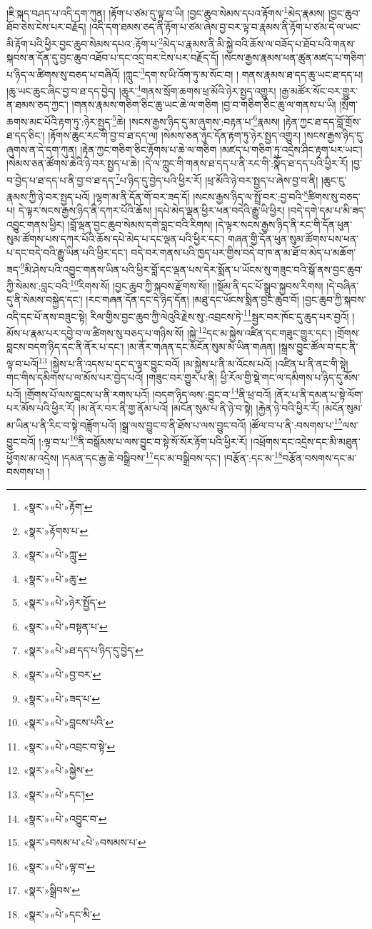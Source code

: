 །ཇི་སྐད་བཤད་པ་འདི་དག་ཀུན། །རྟོག་པ་ཙམ་དུ་ལྟ་བ་ཡི། །བྱང་ཆུབ་སེམས་དཔའ་རྟོགས་\footnote{«སྣར་»«པེ་»རྟོག་}མེད་རྣམས། །བྱང་ཆུབ་ཐོབ་ཅེས་ངེས་པར་བརྗོད། །འདི་དག་ཐམས་ཅད་ནི་རྟོག་པ་ཙམ་ཞེས་བྱ་བར་ལྟ་བ་རྣམས་ནི་རྟོག་པ་ཙམ་དེ་ལ་ཡང་མི་རྟོག་པའི་ཕྱིར་བྱང་ཆུབ་སེམས་དཔའ་:རྟོག་པ་\footnote{«སྣར་»རྟོགས་པ་}མེད་པ་རྣམས་ནི་མི་སྐྱེ་བའི་ཆོས་ལ་བཟོད་པ་ཐོབ་པའི་གནས་སྐབས་ན་དོན་དུ་བྱང་ཆུབ་འཐོབ་པ་དང་འདྲ་བར་ངེས་པར་བརྗོད་དོ། །སངས་རྒྱས་རྣམས་ཕན་ཚུན་མཛད་པ་གཅིག་པ་ཉིད་ལ་ཚིགས་སུ་བཅད་པ་བཞིའོ། །ཀླུང་\footnote{«སྣར་»«པེ་»ཀླུ་}དག་ས་ཡི་འོག་ཏུ་མ་སོང་བ། །
གནས་རྣམས་ཐ་དད་ཆུ་ཡང་ཐ་དད་པ། །ཆུ་ཡང་ཆུང་ཞིང་བྱ་བ་ཐ་དད་བྱེད། །ཆུར་\footnote{«སྣར་»«པེ་»ཆུ་}གནས་སྲོག་ཆགས་ཕྲ་མོའི་ཉེར་སྤྱད་འགྱུར། །རྒྱ་མཚོར་སོང་བར་གྱུར་ན་ཐམས་ཅད་ཀྱང་། །གནས་རྣམས་གཅིག་ཅིང་ཆུ་ཡང་ཆེ་ལ་གཅིག །བྱ་བ་གཅིག་ཅིང་ཆུ་ལ་གནས་པ་ཡི། །སྲོག་ཆགས་མང་པོའི་རྟག་ཏུ་:ཉེར་སྤྱད་\footnote{«སྣར་»«པེ་»ཉེར་སྤྱོད་}ཆེ། །སངས་རྒྱས་ཉིད་དུ་མ་ཞུགས་:བརྟན་པ་\footnote{«སྣར་»«པེ་»བསྟན་པ་}རྣམས། །རྟེན་ཀྱང་ཐ་དད་བློ་གྲོས་ཐ་དད་ཅིང་། །རྟོགས་ཆུང་རང་གི་བྱ་བ་ཐ་དད་ལ། །སེམས་ཅན་ཉུང་དོན་རྟག་ཏུ་ཉེར་སྤྱད་འགྱུར། །སངས་རྒྱས་ཉིད་དུ་ཞུགས་ན་དེ་དག་ཀུན། །རྟེན་ཀྱང་གཅིག་ཅིང་རྟོགས་པ་ཆེ་ལ་གཅིག །མཛད་པ་གཅིག་ཏུ་འདྲེས་ཤིང་རྟག་པར་ཡང་། །སེམས་ཅན་ཚོགས་ཆེའི་ཉེ་བར་སྤྱད་པ་ཆེ། །དེ་ལ་ཀླུང་གི་གནས་ཐ་དད་པ་ནི་རང་གི་:སྣོད་ཐ་དད་པའི་ཕྱིར་རོ། །བྱ་བ་བྱེད་པ་ཐ་དད་པ་ནི་བྱ་བ་ཐ་དད་\footnote{«སྣར་»«པེ་»ཐ་དད་པ་ཉིད་དུ་བྱེད་}པ་ཉིད་དུ་བྱེད་པའི་ཕྱིར་རོ། །ཕྲ་མོའི་ཉེ་བར་སྤྱད་པ་ཞེས་བྱ་བ་ནི། །ཆུང་ངུ་རྣམས་ཀྱི་ཉེ་བར་སྤྱད་པའོ། །ལྷག་མ་ནི་དོན་གོ་བར་ཟད་དོ། །སངས་རྒྱས་ཉིད་ལ་སྤྲོ་བར་:བྱ་བའི་\footnote{«སྣར་»«པེ་»བྱ་བར་}ཚིགས་སུ་བཅད་པ། དེ་ལྟར་སངས་རྒྱས་ཉིད་ནི་དཀར་པོའི་ཆོས། །དཔེ་མེད་ལྡན་ཕྱིར་ཕན་བདེའི་རྒྱུ་ཡི་ཕྱིར། །བདེ་དགེ་དམ་པ་མི་ཟད་འབྱུང་གནས་ཕྱིར། །བློ་ལྡན་བྱང་ཆུབ་སེམས་དགེ་བླང་བའི་རིགས། །དེ་ལྟར་སངས་རྒྱས་ཉིད་ནི་རང་གི་དོན་ཕུན་སུམ་ཚོགས་པས་དཀར་པོའི་ཆོས་དཔེ་མེད་པ་དང་ལྡན་པའི་ཕྱིར་དང་། གཞན་གྱི་དོན་ཕུན་སུམ་ཚོགས་པས་ཕན་པ་དང་བདེ་བའི་རྒྱུ་ཡིན་པའི་ཕྱིར་དང་། བདེ་བར་གནས་པའི་ཁྱད་པར་གྱིས་བདེ་བ་ཁ་ན་མ་ཐོ་བ་མེད་པ་མཆོག་ཟད་\footnote{«སྣར་»«པེ་»ཟད་པ་}མི་ཤེས་པའི་འབྱུང་གནས་ཡིན་པའི་ཕྱིར་བློ་དང་ལྡན་པས་དེར་སྨོན་པ་ཡོངས་སུ་གཟུང་བའི་སྒོ་ནས་བྱང་ཆུབ་ཀྱི་སེམས་:བླང་བའི་\footnote{«སྣར་»«པེ་»བླངས་པའི་}རིགས་སོ། །བྱང་ཆུབ་ཀྱི་སྐབས་རྫོགས་སོ།། །།སྡོམ་ནི་དང་པོ་སྒྲུབ་སྐྱབས་རིགས། །དེ་བཞིན་དུ་ནི་སེམས་བསྐྱེད་དང་། །རང་གཞན་དོན་དང་དེ་ཉིད་དོན། །མཐུ་དང་ཡོངས་སྨིན་བྱང་ཆུབ་བོ། །བྱང་ཆུབ་ཀྱི་སྐབས་འདི་དང་པོ་ནས་བཟུང་སྟེ། རིལ་གྱིས་བྱང་ཆུབ་ཀྱི་ལེའུའི་རྗེས་སུ་:འབྲངས་ཏེ་\footnote{«སྣར་»«པེ་»འབྲང་བ་སྟེ་}སྦྱར་བར་ཁོང་དུ་ཆུད་པར་བྱའོ། །མོས་པ་རྣམ་པར་དབྱེ་བ་ལ་ཚིགས་སུ་བཅད་པ་གཉིས་སོ། །སྐྱེ་\footnote{«སྣར་»«པེ་»སྐྱེས་}དང་མ་སྐྱེས་འཛིན་དང་གཟུང་གྱུར་དང་། །གྲོགས་བླངས་བདག་ཉིད་དང་ནི་ནོར་པ་དང་། །མ་ནོར་གཞན་དང་མངོན་སུམ་མ་ཡིན་གཞན། །སྒྲས་བྱུང་ཚོལ་བ་དང་ནི་ལྟ་བ་པའོ།\footnote{«སྣར་»«པེ་»དང་།} །སྐྱེས་པ་ནི་འདས་པ་དང་ད་ལྟར་བྱུང་བའོ། །མ་སྐྱེས་པ་ནི་མ་འོངས་པའོ། །འཛིན་པ་ནི་ནང་གི་སྟེ། གང་གིས་དམིགས་པ་ལ་མོས་པར་བྱེད་པའོ། །གཟུང་བར་གྱུར་པ་ནི། ཕྱི་རོལ་གྱི་སྡེ་གང་ལ་དམིགས་པ་ཉིད་དུ་མོས་པའོ། །གྲོགས་པོ་ལས་བླངས་པ་ནི་རགས་པའོ། །བདག་ཉིད་ལས་:བྱུང་བ་\footnote{«སྣར་»«པེ་»འབྱུང་བ་}ནི་ཕྲ་བའོ། །ནོར་པ་ནི་དམན་པ་སྟེ་ལོག་པར་མོས་པའི་ཕྱིར་རོ། །མ་ནོར་བར་ནི་གྱ་ནོམ་པའོ། །མངོན་སུམ་པ་ནི་ཉེ་བ་སྟེ། །རྐྱེན་ཉེ་བའི་ཕྱིར་རོ། །མངོན་སུམ་མ་ཡིན་པ་ནི་རིང་བ་སྟེ་བཟློག་པའོ། །སྒྲ་ལས་བྱུང་བ་ནི་ཐོས་པ་ལས་བྱུང་བའོ། །ཚོལ་བ་པ་ནི་:བསགས་པ་\footnote{«སྣར་»བསམ་པ་«པེ་»བསམས་པ་}ལས་བྱུང་བའོ། །:ལྟ་བ་པ་\footnote{«སྣར་»«པེ་»ལྟ་བ་}ནི་བསྒོམས་པ་ལས་བྱུང་བ་སྟེ་སོ་སོར་རྟོག་པའི་ཕྱིར་རོ། །འཕྲོགས་དང་འདྲེས་དང་མི་མཐུན་ཕྱོགས་མ་འདྲེས། །དམན་དང་རྒྱ་ཆེ་བསྒྲིབས་\footnote{«སྣར་»སྒྲིབས་}དང་མ་བསྒྲིབས་དང་། །བརྩོན་:དང་མ་\footnote{«སྣར་»«པེ་»དང་མི་}བརྩོན་བསགས་དང་མ་བསགས་པ། །
